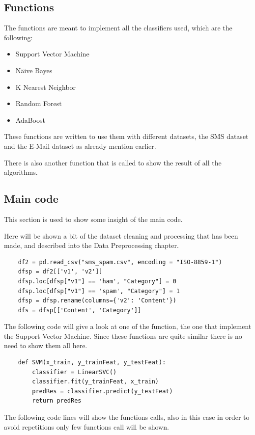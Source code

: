 \documentclass[a4paper]{report}
\begin{document}
\subsection{Functions}
The functions are meant to implement all the classifiers used, which are the following:
\begin{itemize}
	\item Support Vector Machine
	\item Näive Bayes
	\item K Nearest Neighbor
	\item Random Forest
	\item AdaBoost
\end{itemize}

\noindent These functions are written to use them with different datasets, the SMS dataset and the E-Mail dataset as already mention earlier.

\noindent There is also another function that is called to show the result of all the algorithms.
\newpage
\subsection{Main code}
This section is used to show some insight of the main code.

\noindent Here will be shown a bit of the dataset cleaning and processing that has been made, and described into the Data Preprocessing chapter. 

\lstset{ language=json}
\begin{lstlisting}
	df2 = pd.read_csv("sms_spam.csv", encoding = "ISO-8859-1")
	dfsp = df2[['v1', 'v2']]
	dfsp.loc[dfsp["v1"] == 'ham', "Category"] = 0
	dfsp.loc[dfsp["v1"] == 'spam', "Category"] = 1
	dfsp = dfsp.rename(columns={'v2': 'Content'})
	dfs = dfsp[['Content', 'Category']]
\end{lstlisting}

\noindent The following code will give a look at one of the function, the one that implement the Support Vector Machine. Since these functions are quite similar there is no need to show them all here.

\lstset{ language=json}
\begin{lstlisting}
	def SVM(x_train, y_trainFeat, y_testFeat):
		classifier = LinearSVC()
		classifier.fit(y_trainFeat, x_train)
		predRes = classifier.predict(y_testFeat)
		return predRes
\end{lstlisting}

\noindent The following code lines will show the functions calls, also in this case in order to avoid repetitions only few functions call will be shown.
\end{document}
